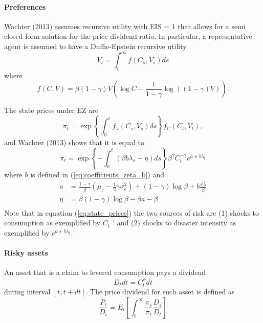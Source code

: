 \documentclass[11pt]{article}
\begin{document}
\paragraph{Preferences}

Wachter (2013) assumes recursive utility with EIS = 1 that allows for a semi closed form solution for the price dividend ratio. In particular, a representative agent is assumed to have a Duffie-Epstein recursive utility
\[V_t = \int_{t}^\infty f(C_s, V_s)ds\]
where
\[f(C, V) = \beta(1-\gamma)V\left(\log C - \frac{1}{1-\gamma}\log((1-\gamma)V)\right).\]

The state prices under EZ are
\begin{equation}\label{eq:state_prices_general}
    \pi_t = \exp\left\{\int_0^t f_V(C_s, V_s)ds\right\}f_C(C_t, V_t),
\end{equation}
and Wachter (2013) shows that it is equal to
\begin{equation}\label{eq:state_prices}
    \pi_t = \exp\left\{-\int_0^t (\beta b \lambda_s - \eta)ds\right\}\beta^\gamma C_t^{-\gamma}e^{a + b\lambda_t}
\end{equation}
where $b$ is defined in (\ref{eq:coefficients_zeta_b}) and
\begin{equation}\label{eq:coefficients_a_eta}
    \begin{aligned}
        a &= \frac{1-\gamma}{\beta}\left(\mu_c - \frac{1}{2}\gamma\sigma_c^2\right) + (1-\gamma)\log\beta + b \frac{\kappa \overline{\lambda}}{\beta} \\
        \eta &= \beta(1-\gamma)\log\beta - \beta a - \beta \\
    \end{aligned}
\end{equation}
Note that in equation (\ref{eq:state_prices}) the two sources of risk are (1) shocks to consumption as exemplified by $C_t^{-\gamma}$ and (2) shocks to disaster intensity as exemplified by $e^{a + b\lambda_t}$.

\paragraph{Risky assets}

An asset that is a claim to levered consumption pays a dividend
\[D_t dt = C_t^\phi dt\]
during interval $[t,t+dt]$. The price dividend for such asset is defined as
\[\frac{P_t}{D_t} = E_t\left[\int_t^\infty \frac{\pi_s}{\pi_t}\frac{D_s}{D_t}\right]\]
\end{document}
